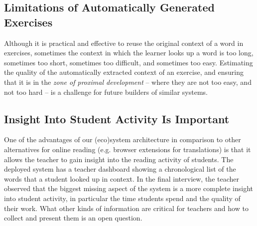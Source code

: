 \subsection{Limitations of Automatically Generated Exercises}
Although it is practical and effective to reuse the original context of a word in exercises\cite{nagy95-context}, sometimes the context in which the learner looks up a word is too long, sometimes too short, sometimes too difficult, and sometimes too easy. Estimating the quality of the automatically extracted context of an exercise, and ensuring that it is in the {\em zone of proximal development} -- where they are not too easy, and not too hard \cite{Zaretskii09-ProximalDevelopment} -- is a challenge for future builders of similar systems. 



\subsection{Insight Into Student Activity Is Important}
One of the advantages of our (eco)system architecture in comparison to other alternatives for online reading (e.g. browser extensions for translations) is that it allows the teacher to gain insight into the reading activity of students. The deployed system has a teacher dashboard showing a chronological list of the words that a student looked up in context. In the final interview, the teacher observed that the biggest missing aspect of the system is a more complete insight into student activity, in particular the time students spend and the quality of their work. What other kinds of information are critical for teachers and how to collect and present them is an open question.







